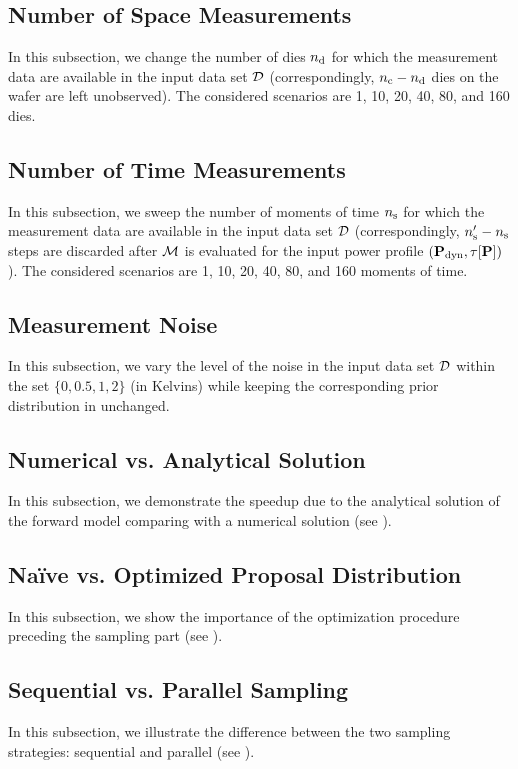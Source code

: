 \subsection{Number of Space Measurements}
In this subsection, we change the number of dies ${n_{\text{d}}}$ for which the measurement data are available in the input data set $\mathcal{D}$ (correspondingly, ${n_{\text{c}}} - {n_{\text{d}}}$ dies on the wafer are left unobserved). The considered scenarios are 1, 10, 20, 40, 80, and 160 dies.

\subsection{Number of Time Measurements}
In this subsection, we sweep the number of moments of time ${n_\text{s}}$ for which the measurement data are available in the input data set $\mathcal{D}$ (correspondingly, ${n_\text{s}'} - {n_\text{s}}$ steps are discarded after $\model$ is evaluated for the input power profile $(\mathbf{P}_{\text{dyn}}, \tau[\mathbf{P}])$). The considered scenarios are 1, 10, 20, 40, 80, and 160 moments of time.

\subsection{Measurement Noise}
In this subsection, we vary the level of the noise in the input data set $\mathcal{D}$ within the set $\{ 0, 0.5, 1, 2 \}$ (in Kelvins) while keeping the corresponding prior distribution in  unchanged.

\subsection{Numerical vs. Analytical Solution}
In this subsection, we demonstrate the speedup due to the analytical solution of the forward model comparing with a numerical solution (see ).

\subsection{Na\"{i}ve vs. Optimized Proposal Distribution}
In this subsection, we show the importance of the optimization procedure preceding the sampling part (see ).

\subsection{Sequential vs. Parallel Sampling}
In this subsection, we illustrate the difference between the two sampling strategies: sequential and parallel (see ).
